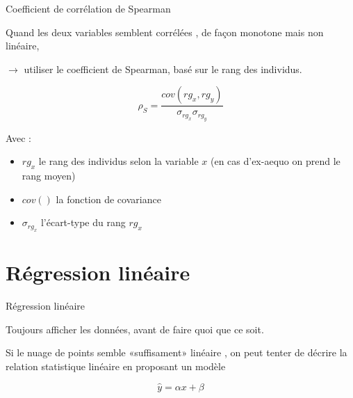\documentclass{beamer}
\begin{document}
\begin{frame}{Coefficient de corrélation de Spearman}



Quand les deux variables semblent corrélées , de façon \alert{monotone} mais \alert{non linéaire},

$\rightarrow$ utiliser le coefficient de \alert{Spearman}, basé sur le \alert{rang} des individus.


$$\rho_S= \frac{cov(rg_x, rg_y)}{\sigma_{rg_x}\sigma_{rg_y}}$$


Avec :
\begin{itemize}
  \item $rg_x$ le rang des individus selon la variable $x$  (en cas d'ex-aequo on prend le rang moyen)
  \item $cov()$ la fonction de covariance
  \item $\sigma_{rg_x}$ l'écart-type du rang $rg_x$
\end{itemize}



\end{frame}


\section{Régression linéaire}

\begin{frame}{Régression linéaire}


\alert{Toujours} afficher les données, avant de faire quoi que ce soit.


\alert{Si} le nuage de points semble «suffisament» linéaire , on peut tenter de décrire la relation statistique linéaire en proposant un \alert{modèle}

$$\hat{y} = \alpha x + \beta$$



\end{frame}

\end{document}
